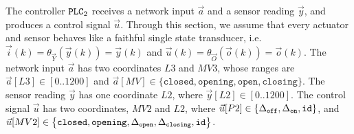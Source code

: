 {The controller $\texttt{PLC}_2$ receives a network input $\vec{a}$ and a sensor reading $\vec{y}$, and produces a control signal $\vec{u}$. Through this section, we assume that every actuator and sensor behaves like a faithful single state transducer, i.e. $\vec{i}(k)=\theta_{\vec{Y}}(\vec{y}(k))=\vec{y}(k)$ and $\vec{u}(k)=\theta_{\vec{O}}(\vec{o}(k))=\vec{o}(k)$. 
The network input $\vec{a}$ has two coordinates $L3$ and $MV3$, whose ranges are $\vec{a}[L3]\in[0..1200]$ and $\vec{a}[MV]\in \{\texttt{closed},\texttt{opening},\texttt{open},\texttt{closing}\}$. 
The sensor reading $\vec{y}$ has one coordinate $L2$, where $\vec{y}[L2]\in[0..1200]$. 
The control signal $\vec{u}$ has two coordinates, $MV2$ and $L2$, where $\vec{u}[P2]\in\left\{{\Delta}_\texttt{off},{\Delta}_\texttt{on},{\texttt{id}}\right\}$, and $\vec{u}[MV2]\in\left\{\texttt{closed},\texttt{opening},{\Delta}_\texttt{open},{\Delta}_\texttt{closing}, {\texttt{id}}\right\}$.

}
